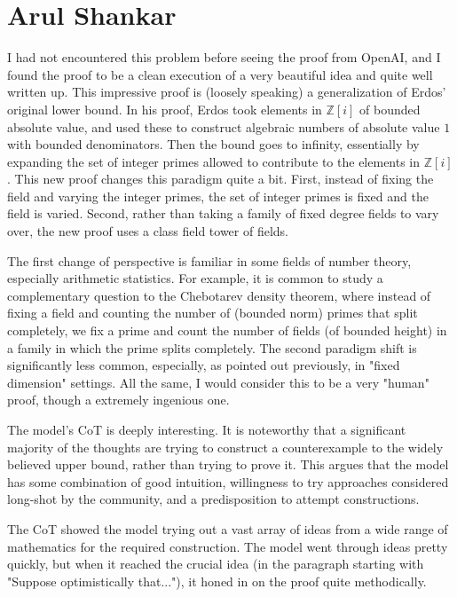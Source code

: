 \documentclass[11pt,reqno]{amsart}
\numberwithin{equation}{section}
\theoremstyle{definition}
\theoremstyle{remark}
\newcommand{\Z}{\mathbb{Z}}
\begin{document}
\section{Arul Shankar}

I had not encountered this problem before seeing the proof from OpenAI, and I found the proof to be a clean execution of a very beautiful idea and quite well written up.
This impressive proof is (loosely speaking) a generalization of Erdos' original lower bound. In his proof, Erdos took elements in $\Z[i]$ of bounded absolute value, and used these to construct algebraic numbers of absolute value $1$ with bounded denominators. Then the bound goes to infinity, essentially by expanding the set of integer primes allowed to contribute to the elements in $\Z[i]$. This new proof changes this paradigm quite a bit. First, instead of fixing the field and varying the integer primes, the set of integer primes is fixed and the field is varied. Second, rather than taking a family of fixed degree fields to vary over, the new proof uses a class field tower of fields.

The first change of perspective is familiar in some fields of number theory, especially arithmetic statistics. For example, it is common to study a complementary question to the Chebotarev density theorem, where instead of fixing a field and counting the number of (bounded norm) primes that split completely, we fix a prime and count the number of fields (of bounded height) in a family in which the prime splits completely. The second paradigm shift is significantly less common, especially, as pointed out previously, in "fixed dimension" settings. All the same, I would consider this to be a very "human" proof, though a extremely ingenious one.

The model's CoT is deeply interesting. It is noteworthy that a significant majority of the thoughts are trying to construct a counterexample to the widely believed upper bound, rather than trying to prove it. This argues that the model has some combination of good intuition, willingness to try approaches considered long-shot by the community, and a predisposition to attempt constructions.

The CoT showed the model trying out a vast array of ideas from a wide range of mathematics for the required construction. The model went through ideas pretty quickly, but when it reached the crucial idea (in the paragraph starting with "Suppose optimistically that..."), it honed in on the proof quite methodically.
\end{document}
